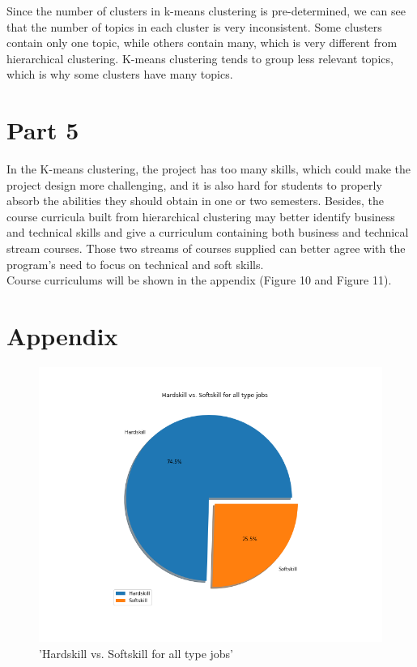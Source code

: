 \documentclass[10pt,onecolumn,letterpaper]{article}
\begin{document}
\noindent Since the number of clusters in k-means clustering is pre-determined, we can see that the number of topics in each cluster is very inconsistent. Some clusters contain only one topic, while others contain many, which is very different from hierarchical clustering. K-means clustering tends to group less relevant topics, which is why some clusters have many topics.

\section*{Part 5}
In the K-means clustering, the project has too many skills, which could make the project design more challenging, and it is also hard for students to properly absorb the abilities they should obtain in one or two semesters. Besides, the course curricula built from hierarchical clustering may better identify business and technical skills and give a curriculum containing both business and technical stream courses. Those two streams of courses supplied can better agree with the program's need to focus on technical and soft skills.\\

\noindent Course curriculums will be shown in the appendix (Figure 10 and Figure 11).

\section*{Appendix}

\appendix

\begin{figure}[H]
  \centering
  \includegraphics[width=.75\textwidth]{f2.png}
  \caption{'Hardskill vs. Softskill for all type jobs'}
\end{figure}
\end{document}
